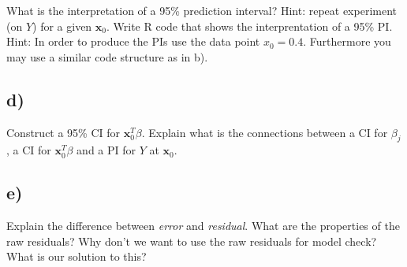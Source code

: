 \documentclass[]{article}
\begin{document}
What is the interpretation of a 95\% prediction interval? Hint: repeat
experiment (on \(Y\)) for a given \({\boldsymbol x}_0\). Write R code
that shows the interprentation of a 95\% PI. Hint: In order to produce
the PIs use the data point \(x_0 = 0.4.\) Furthermore you may use a
similar code structure as in b).

\hypertarget{d-1}{%
\subsection{d)}\label{d-1}}

Construct a 95\% CI for \({\boldsymbol x}_0^T \beta\). Explain what is
the connections between a CI for \(\beta_j\), a CI for
\({\boldsymbol x}_0^T \beta\) and a PI for \(Y\) at
\({\boldsymbol x}_0\).

\hypertarget{e-1}{%
\subsection{e)}\label{e-1}}

Explain the difference between \emph{error} and \emph{residual}. What
are the properties of the raw residuals? Why don't we want to use the
raw residuals for model check? What is our solution to this?
\end{document}
